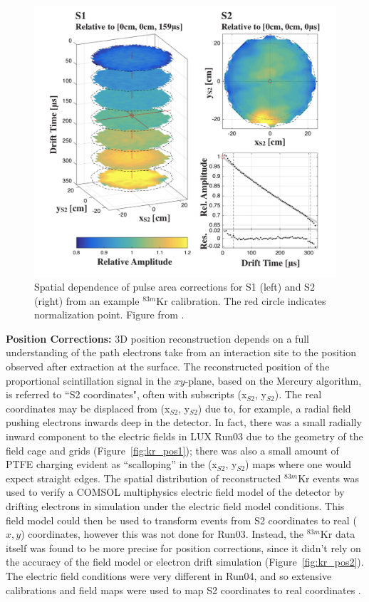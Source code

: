 \begin{figure}[htbp]
\begin{center}
\includegraphics[width=\textwidth]{figures/lux/kr_1.png}
\caption{ Spatial dependence of pulse area corrections for S1 (left) and S2 (right) from an example $^{83m}$Kr calibration. The red circle indicates normalization point. Figure from \cite{LUXKr}.}
\label{fig:kr_1}
\end{center}
\end{figure}

\textbf{Position Corrections:} 3D position reconstruction depends on a full understanding of the path electrons take from an interaction site to the position observed after extraction at the surface. The reconstructed position of the proportional scintillation signal in the $xy$-plane, based on the Mercury algorithm, is referred to ``S2 coordinates", often with subscripts (x$_{S2}$, y$_{S2}$). The real coordinates may be displaced from (x$_{S2}$, y$_{S2}$) due to, for example, a radial field pushing electrons inwards deep in the detector. In fact, there was a small radially inward component to the electric fields in \ac{LUX} Run03 due to the geometry of the field cage and grids (Figure~\ref{fig:kr_pos1}); there was also a small amount of \ac{PTFE} charging evident as ``scalloping'' in the (x$_{S2}$, y$_{S2}$) maps where one would expect straight edges. The spatial distribution of reconstructed $^{83m}$Kr events was used to verify a COMSOL multiphysics electric field model of the detector by drifting electrons in simulation under the electric field model conditions. This field model could then be used to transform events from S2 coordinates to real ($x,y$) coordinates, however this was not done for Run03. Instead, the $^{83m}$Kr data itself was found to be more precise for position corrections, since it didn't rely on the accuracy of the field model or electron drift simulation (Figure~\ref{fig:kr_pos2}). The electric field conditions were very different in Run04, and so extensive calibrations and field maps were used to map S2 coordinates to real coordinates \cite{LUXFields}.

